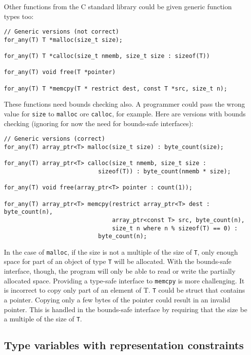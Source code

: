 Other functions from the C standard library could be given generic function types too:
\begin{lstlisting}
// Generic versions (not correct)
for_any(T) T *malloc(size_t size);

for_any(T) T *calloc(size_t nmemb, size_t size : sizeof(T))

for_any(T) void free(T *pointer)

for_any(T) T *memcpy(T * restrict dest, const T *src, size_t n);
\end{lstlisting}
These functions need bounds checking also.  A programmer
could pass the wrong value for \lstinline+size+ to \lstinline+malloc+
ore \lstinline+calloc+, for example.  Here are
versions with bounds checking (ignoring for now the need for bounds-safe interfaces):
\begin{lstlisting}
// Generic versions (correct)
for_any(T) array_ptr<T> malloc(size_t size) : byte_count(size);

for_any(T) array_ptr<T> calloc(size_t nmemb, size_t size : 
                           sizeof(T)) : byte_count(nmemb * size);

for_any(T) void free(array_ptr<T> pointer : count(1));

for_any(T) array_ptr<T> memcpy(restrict array_ptr<T> dest : byte_count(n),
                               array_ptr<const T> src, byte_count(n),
                               size_t n where n % sizeof(T) == 0) :
                           byte_count(n);
\end{lstlisting}
In the case of \lstinline+malloc+, if the size is not a multiple of the size of \lstinline+T+,
only enough space for part of an object of type \lstinline+T+ will be allocated.  With the 
bounds-safe interface, though, the program will only be able to read or write the 
partially allocated space.   Providing a type-safe interface to \lstinline+memcpy+
is more challenging.   It is incorrect to copy only part of an element of T.
\lstinline+T+ could be struct that contains a pointer.  Copying only a few bytes
of the pointer could result in an invalid pointer.
This is handled in the bounds-safe interface by requiring that the
size be a multiple of the size of \lstinline+T+.

\subsection{Type variables with representation constraints}

